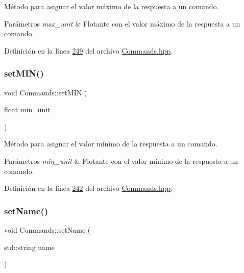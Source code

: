 Método para asignar el valor máximo de la respuesta a un comando. 


\begin{DoxyParams}{Parámetros}
{\em max\+\_\+unit} & Flotante con el valor máximo de la respuesta a un comando. \\
\hline
\end{DoxyParams}


Definición en la línea \hyperlink{Commands_8hpp_source_l00249}{249} del archivo \hyperlink{Commands_8hpp_source}{Commands.\+hpp}.

\mbox{\label{classCommands_a073788fa37adc5fc91d3a40b869b8e67}} 
\subsubsection{\texorpdfstring{set\+M\+I\+N()}{setMIN()}}
{\footnotesize\ttfamily void Commands\+::set\+M\+IN (\begin{DoxyParamCaption}\item[{float}]{min\+\_\+unit }\end{DoxyParamCaption})\hspace{0.3cm}{\ttfamily [inline]}}



Método para asignar el valor mínimo de la respuesta a un comando. 


\begin{DoxyParams}{Parámetros}
{\em min\+\_\+unit} & Flotante con el valor mínimo de la respuesta a un comando. \\
\hline
\end{DoxyParams}


Definición en la línea \hyperlink{Commands_8hpp_source_l00242}{242} del archivo \hyperlink{Commands_8hpp_source}{Commands.\+hpp}.

\mbox{\label{classCommands_a8fd31a6ed848078dd67bf7ae303cfb9b}} 
\subsubsection{\texorpdfstring{set\+Name()}{setName()}}
{\footnotesize\ttfamily void Commands\+::set\+Name (\begin{DoxyParamCaption}\item[{std\+::string}]{name }\end{DoxyParamCaption})\hspace{0.3cm}{\ttfamily [inline]}}



